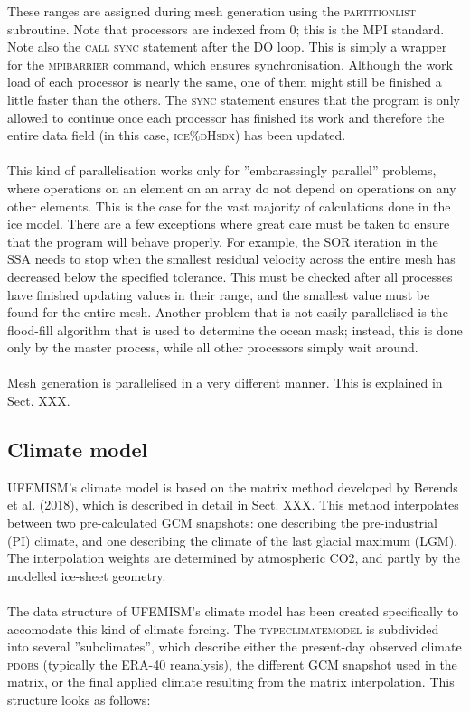 \documentclass{article}
\begin{document}
These ranges are assigned during mesh generation using the \textsc{partition\textunderscore list} subroutine. Note that processors are indexed from 0; this is the MPI standard. Note also the \textsc{call sync} statement after the \textsc{DO} loop. This is simply a wrapper for the \textsc{mpi\textunderscore barrier} command, which ensures synchronisation. Although the work load of each processor is nearly the same, one of them might still be finished a little faster than the others. The \textsc{sync} statement ensures that the program is only allowed to continue once each processor has finished its work and therefore the entire data field (in this case, \textsc{ice\%dHs\textunderscore dx}) has been updated.\\
\\
This kind of parallelisation works only for ''embarassingly parallel'' problems, where operations on an element on an array do not depend on operations on any other elements. This is the case for the vast majority of calculations done in the ice model. There are a few exceptions where great care must be taken to ensure that the program will behave properly. For example, the SOR iteration in the SSA needs to stop when the smallest residual velocity across the entire mesh has decreased below the specified tolerance. This must be checked after all processes have finished updating values in their range, and the smallest value must be found for the entire mesh. Another problem that is not easily parallelised is the flood-fill algorithm that is used to determine the ocean mask; instead, this is done only by the master process, while all other processors simply wait around.\\
\\
Mesh generation is parallelised in a very different manner. This is explained in Sect. XXX.

\subsection{Climate model}

UFEMISM's climate model is based on the matrix method developed by Berends et al. (2018), which is described in detail in Sect. XXX. This method interpolates between two pre-calculated GCM snapshots: one describing the pre-industrial (PI) climate, and one describing the climate of the last glacial maximum (LGM). The interpolation weights are determined by atmospheric CO2, and partly by the modelled ice-sheet geometry.\\
\\
The data structure of UFEMISM's climate model has been created specifically to accomodate this kind of climate forcing. The \textsc{type\textunderscore climate\textunderscore model} is subdivided into several ''subclimates'', which describe either the present-day observed climate \textsc{pd\textunderscore obs} (typically the ERA-40 reanalysis), the different GCM snapshot used in the matrix, or the final applied climate resulting from the matrix interpolation. This structure looks as follows:
\end{document}
